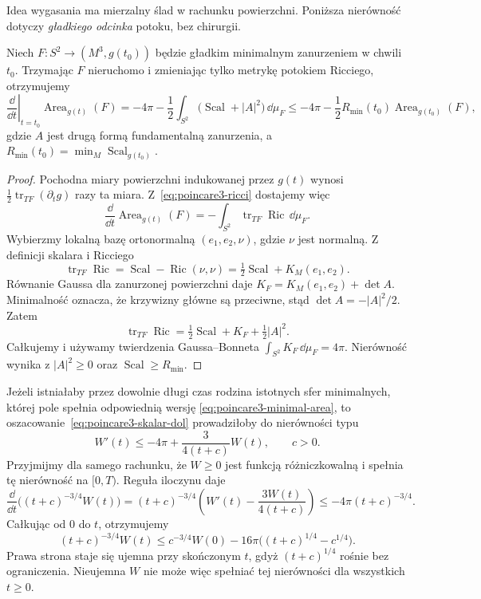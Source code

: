 Idea wygasania ma mierzalny ślad w rachunku
powierzchni. Poniższa nierówność dotyczy
\emph{gładkiego odcinka} potoku, bez chirurgii.

\begin{stwierdzenie}
\label{prop:poincare3-minimal-area}
Niech $F:S^2\to(M^3,g(t_0))$ będzie gładkim
minimalnym zanurzeniem w chwili $t_0$.
Trzymając $F$ nieruchomo i zmieniając tylko
metrykę potokiem Ricciego, otrzymujemy
\begin{equation}\label{eq:poincare3-minimal-area}
 \left.\frac{\dd}{\dd t}\right|_{t=t_0}
 \operatorname{Area}_{g(t)}(F)
 =-4\pi-\frac12\int_{S^2}
   \bigl(\operatorname{Scal}+|A|^2\bigr)\,\dd\mu_F
 \leq-4\pi-\frac12R_{\min}(t_0)
                 \operatorname{Area}_{g(t_0)}(F),
\end{equation}
gdzie $A$ jest drugą formą fundamentalną
zanurzenia, a
$R_{\min}(t_0)=\min_M\operatorname{Scal}_{g(t_0)}$.
\end{stwierdzenie}
\begin{proof}
Pochodna miary powierzchni indukowanej
przez $g(t)$ wynosi
$\frac12\operatorname{tr}_{TF}(\partial_tg)$
razy ta miara. Z~\eqref{eq:poincare3-ricci}
dostajemy więc
\[
 \frac{\dd}{\dd t}\operatorname{Area}_{g(t)}(F)
 =-\int_{S^2}\operatorname{tr}_{TF}
                    \operatorname{Ric}\,\dd\mu_F.
\]
Wybierzmy lokalną bazę ortonormalną
$(e_1,e_2,\nu)$, gdzie $\nu$ jest normalną.
Z definicji skalara i Ricciego
\[
 \operatorname{tr}_{TF}\operatorname{Ric}
 =\operatorname{Scal}-\operatorname{Ric}(\nu,\nu)
 =\tfrac12\operatorname{Scal}+K_M(e_1,e_2).
\]
Równanie Gaussa dla zanurzonej powierzchni daje
$K_F=K_M(e_1,e_2)+\det A$.
Minimalność oznacza, że krzywizny główne
są przeciwne, stąd $\det A=-|A|^2/2$.
Zatem
\[
 \operatorname{tr}_{TF}\operatorname{Ric}
 =\tfrac12\operatorname{Scal}+K_F
                   +\tfrac12|A|^2.
\]
Całkujemy i używamy twierdzenia Gaussa--Bonneta
$\int_{S^2}K_F\,\dd\mu_F=4\pi$.
Nierówność wynika z $|A|^2\geq0$ oraz
$\operatorname{Scal}\geq R_{\min}$.
\end{proof}

Jeżeli istniałaby przez dowolnie długi czas
rodzina istotnych sfer minimalnych, której
pole spełnia odpowiednią wersję
\eqref{eq:poincare3-minimal-area}, to
oszacowanie~\eqref{eq:poincare3-skalar-dol}
prowadziłoby do nierówności typu
\[
 W'(t)\leq-4\pi+
 \frac{3}{4(t+c)}W(t),\qquad c>0.
\]
Przyjmijmy dla samego rachunku, że $W\geq0$ jest funkcją
różniczkowalną i spełnia tę nierówność na $[0,T)$.
Reguła iloczynu daje
\[
 \frac{\dd}{\dd t}\bigl((t+c)^{-3/4}W(t)\bigr)
 =(t+c)^{-3/4}\left(W'(t)-\frac{3W(t)}{4(t+c)}\right)
 \leq-4\pi(t+c)^{-3/4}.
\]
Całkując od $0$ do $t$, otrzymujemy
\[
 (t+c)^{-3/4}W(t)
 \leq c^{-3/4}W(0)
 -16\pi\bigl((t+c)^{1/4}-c^{1/4}\bigr).
\]
Prawa strona staje się ujemna przy skończonym $t$, gdyż
$(t+c)^{1/4}$ rośnie bez ograniczenia. Nieujemna $W$
nie może więc spełniać tej nierówności dla wszystkich $t\geq0$.

